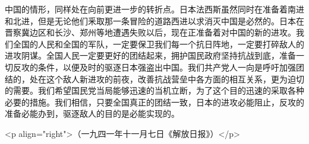 中国的情形，同样处在向前更进一步的转折点。日本法西斯虽然同时在准备着南进和北进，但是无论他们釆取那一条冒险的道路西进以求消灭中国是必然的。日本在晋察冀边区和长沙、郑州等地遭遇失败以后，现在正准备着对中国的新的进攻。我们全国的人民和全国的军队，一定要保卫我们每一个抗日阵地，一定要打碎敌人的进攻阴谋。全国人民一定要更好的团结起来，拥护国民政府坚持抗战到底，准备一切反攻的条件，以便及时的驱逐日本强盗出中国。我们共产党人一向是呼吁加强团结的，处在这个敌人新进攻的前夜，改善抗战营垒中各方面的相互关系，更为迫切的需要。我们希望国民党当局能够迅速的当机立断，为了这个目的迅速的采取各种必要的措施。我们相信，只要全国真正的团结一致，日本的进攻必能阻止，反攻的准备必能办到，驱逐敌人的目的是必能实现的。

<p align="right">（一九四一年十一月七日《解放日报》）</p>

